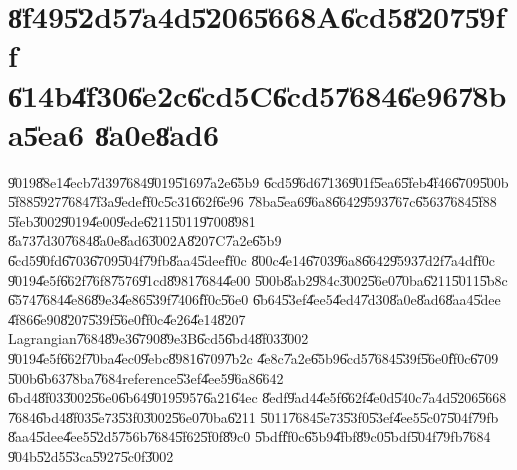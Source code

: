                       

\part{\U{8f49}\U{52d5}\U{7a4d}\U{5206}\U{5668}A\U{6cd5}\U{8207}\U{59ff}%
\U{614b}\U{4f30}\U{6e2c}\U{6cd5}C\U{6cd5}\U{7684}\U{6e96}\U{78ba}\U{5ea6}%
\U{8a0e}\U{8ad6}}

\U{9019}\U{88e1}\U{4ecb}\U{7d39}\U{7684}\U{9019}\U{5169}\U{7a2e}\U{65b9}%
\U{6cd5}\U{96d6}\U{7136}\U{901f}\U{5ea6}\U{5feb}\U{4f46}\U{6709}\U{500b}%
\U{5f88}\U{5927}\U{7684}\U{7f3a}\U{9ede}\U{ff0c}\U{5c31}\U{662f}\U{6e96}%
\U{78ba}\U{5ea6}\U{96a8}\U{6642}\U{9593}\U{767c}\U{6563}\U{7684}\U{5f88}%
\U{5feb}\U{3002}\U{9019}\U{4e00}\U{9ede}\U{6211}\U{5011}\U{9700}\U{8981}%
\U{8a73}\U{7d30}\U{7684}\U{8a0e}\U{8ad6}\U{3002}A\U{8207}C\U{7a2e}\U{65b9}%
\U{6cd5}\U{90fd}\U{6703}\U{6709}\U{504f}\U{79fb}\U{8aa4}\U{5dee}\U{ff0c}%
\U{800c}\U{4e14}\U{6703}\U{96a8}\U{6642}\U{9593}\U{7d2f}\U{7a4d}\U{ff0c}%
\U{9019}\U{4e5f}\U{662f}\U{76f8}\U{7576}\U{91cd}\U{8981}\U{7684}\U{4e00}%
\U{500b}\U{8ab2}\U{984c}\U{3002}\U{56e0}\U{70ba}\U{6211}\U{5011}\U{5b8c}%
\U{6574}\U{7684}\U{4e86}\U{89e3}\U{4e86}\U{539f}\U{7406}\U{ff0c}\U{56e0}%
\U{6b64}\U{53ef}\U{4ee5}\U{4ed4}\U{7d30}\U{8a0e}\U{8ad6}\U{8aa4}\U{5dee}%
\U{4f86}\U{6e90}\U{8207}\U{539f}\U{56e0}\U{ff0c}\U{4e26}\U{4e14}\U{8207}%
Lagrangian\U{7684}\U{89e3}\U{6790}\U{89e3}B\U{6cd5}\U{6bd4}\U{8f03}\U{3002}%
\U{9019}\U{4e5f}\U{662f}\U{70ba}\U{4ec0}\U{9ebc}\U{8981}\U{6709}\U{7b2c}%
\U{4e8c}\U{7a2e}\U{65b9}\U{6cd5}\U{7684}\U{539f}\U{56e0}\U{ff0c}\U{6709}%
\U{500b}\U{6b63}\U{78ba}\U{7684}reference\U{53ef}\U{4ee5}\U{96a8}\U{6642}%
\U{6bd4}\U{8f03}\U{3002}\U{56e0}\U{6b64}\U{9019}\U{5957}\U{6a21}\U{64ec}%
\U{8edf}\U{9ad4}\U{4e5f}\U{662f}\U{4e0d}\U{540c}\U{7a4d}\U{5206}\U{5668}%
\U{7684}\U{6bd4}\U{8f03}\U{5e73}\U{53f0}\U{3002}\U{56e0}\U{70ba}\U{6211}%
\U{5011}\U{7684}\U{5e73}\U{53f0}\U{53ef}\U{4ee5}\U{5c07}\U{504f}\U{79fb}%
\U{8aa4}\U{5dee}\U{4ee5}\U{52d5}\U{756b}\U{7684}\U{5f62}\U{5f0f}\U{89c0}%
\U{5bdf}\U{ff0c}\U{65b9}\U{4fbf}\U{89c0}\U{5bdf}\U{504f}\U{79fb}\U{7684}%
\U{904b}\U{52d5}\U{53ca}\U{5927}\U{5c0f}\U{3002}

\bigskip

